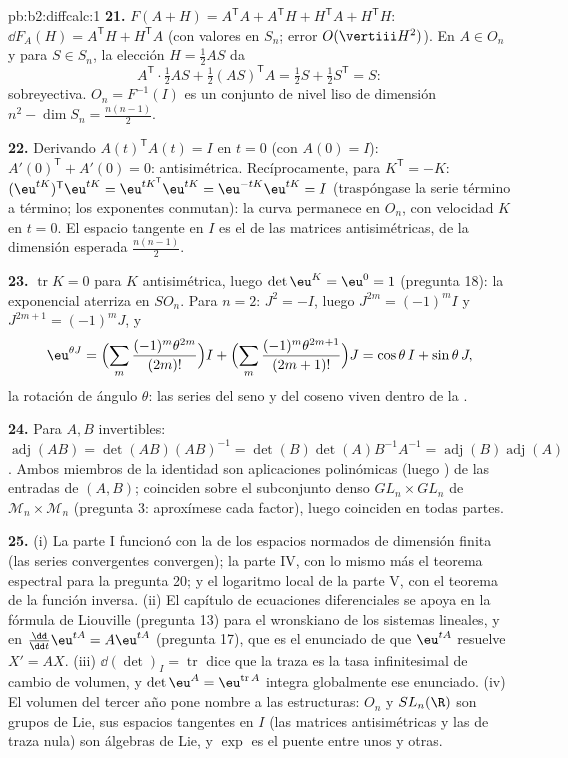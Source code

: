 \begin{solution}{pb:b2:diffcalc:1}
\textbf{21.} $F(A + H) = A^{\mathsf T}A + A^{\mathsf T}H + H^{\mathsf
T}A + H^{\mathsf T}H$: $\dd F_A(H) = A^{\mathsf T}H + H^{\mathsf T}A$
(con valores en $S_n$; error $O(\vertiii H^2)$). En $A \in O_n$ y
para $S \in S_n$, la elección $H = \frac12AS$ da
\[
A^{\mathsf T}\cdot\tfrac12AS + \tfrac12(AS)^{\mathsf T}A
= \tfrac12 S + \tfrac12 S^{\mathsf T} = S :
\]
sobreyectiva. $O_n = F^{-1}(I)$ es un conjunto de nivel liso de
dimensión $n^2 - \dim S_n = \frac{n(n-1)}2$.

\textbf{22.} Derivando $A(t)^{\mathsf T}A(t) = I$ en $t = 0$ (con
$A(0) = I$): $A'(0)^{\mathsf T} + A'(0) = 0$: antisimétrica.
Recíprocamente, para $K^{\mathsf T} = -K$: $(\eu^{tK})^{\mathsf
T}\eu^{tK} = \eu^{tK^{\mathsf T}} \eu^{tK} = \eu^{-tK}\eu^{tK} = I$
(traspóngase la serie término a término; los exponentes conmutan):
la curva permanece en $O_n$, con velocidad $K$ en $t = 0$. El espacio
tangente en $I$ es el de las matrices antisimétricas, de la dimensión
esperada $\frac{n(n-1)}2$.

\textbf{23.} $\operatorname{tr}K = 0$ para $K$ antisimétrica, luego
$\det\eu^K = \eu^0 = 1$ (pregunta 18): la exponencial aterriza en
$SO_n$. Para $n = 2$: $J^2 = -I$, luego $J^{2m} = (-1)^mI$ y
$J^{2m+1} = (-1)^mJ$, y
\[
\eu^{\theta J}
= \Bigl(\sum_m\frac{(-1)^m\theta^{2m}}{(2m)!}\Bigr)I
+ \Bigl(\sum_m\frac{(-1)^m\theta^{2m+1}}{(2m+1)!}\Bigr)J
= \cos\theta\,I + \sin\theta\,J ,
\]
la rotación de ángulo $\theta$: las series del seno y del coseno
viven dentro de la .

\textbf{24.} Para $A, B$ invertibles: $\operatorname{adj}(AB) =
\det(AB)(AB)^{-1} = \det(B)\det(A)B^{-1}A^{-1} =
\operatorname{adj}(B)\operatorname{adj}(A)$. Ambos miembros de la
identidad son aplicaciones polinómicas (luego ) de las
entradas de $(A, B)$; coinciden sobre el subconjunto denso
$GL_n\times GL_n$ de $\mathcal M_n\times\mathcal M_n$ (pregunta 3:
aproxímese cada factor), luego coinciden en todas partes.

\textbf{25.} (i) La parte I funcionó con la  de los espacios
normados de dimensión finita (las series  convergentes
convergen); la parte IV, con lo mismo más el teorema espectral para
la pregunta 20; y el logaritmo local de la parte V, con el teorema de
la función inversa. (ii) El capítulo de ecuaciones diferenciales se
apoya en la fórmula de Liouville (pregunta 13) para el wronskiano de
los sistemas lineales, y en $\frac{\dd}{\dd t}\eu^{tA} = A\eu^{tA}$
(pregunta 17), que es el enunciado de que $\eu^{tA}$ resuelve $X' =
AX$. (iii) $\dd(\det)_I = \operatorname{tr}$ dice que la traza es la
tasa infinitesimal de cambio de volumen, y $\det\eu^A =
\eu^{\operatorname{tr}A}$ integra globalmente ese enunciado. (iv) El
volumen del tercer año pone nombre a las estructuras: $O_n$ y
$SL_n(\R)$ son grupos de Lie, sus espacios tangentes en $I$ (las
matrices antisimétricas y las de traza nula) son álgebras de Lie, y
$\exp$ es el puente entre unos y otras.
\end{solution}
